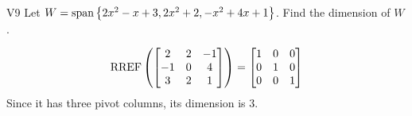 \begin{problem}{V9}
  Let \(
    W=\operatorname{span}\left\{ 2x^2-x+3, 2x^2+2, -x^2+4x+1 \right\}\).
  Find the dimension of \(W\).
\end{problem}
\begin{solution}
  \[\operatorname{RREF}\left(
    \begin{bmatrix}
      2 & 2 & -1 \\
      -1 & 0 & 4 \\
      3 & 2 & 1
    \end{bmatrix} \right)= \begin{bmatrix}
      1 & 0 &0 \\
      0 & 1 & 0 \\
      0 & 0 & 1
    \end{bmatrix}
  \]
  Since it has three pivot columns, its dimension is \(3\).
\end{solution}
